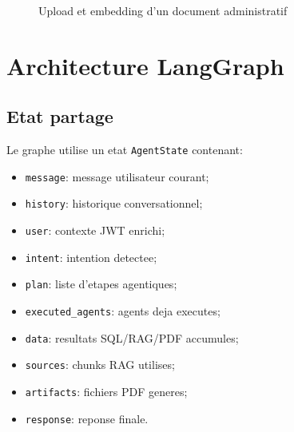 \documentclass[11pt,a4paper]{article}
\begin{document}
\begin{figure}[H]
\centering
{}
\caption{Upload et embedding d'un document administratif}
\end{figure}

\section{Architecture LangGraph}

\subsection{Etat partage}

Le graphe utilise un etat \texttt{AgentState} contenant:

\begin{itemize}[leftmargin=1.2cm]
  \item \texttt{message}: message utilisateur courant;
  \item \texttt{history}: historique conversationnel;
  \item \texttt{user}: contexte JWT enrichi;
  \item \texttt{intent}: intention detectee;
  \item \texttt{plan}: liste d'etapes agentiques;
  \item \texttt{executed\_agents}: agents deja executes;
  \item \texttt{data}: resultats SQL/RAG/PDF accumules;
  \item \texttt{sources}: chunks RAG utilises;
  \item \texttt{artifacts}: fichiers PDF generes;
  \item \texttt{response}: reponse finale.
\end{itemize}
\end{document}
